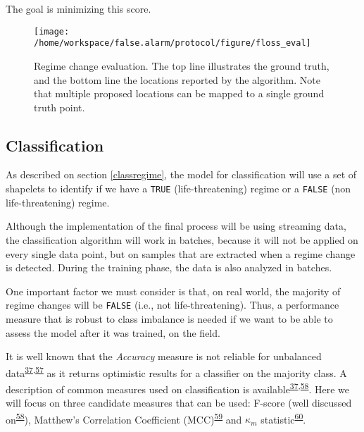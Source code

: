 \documentclass[12pt,twoside]{fmupthesis}
\begin{document}
The goal is minimizing this score.
\begin{figure}

{\centering \texttt{[image: /home/workspace/false.alarm/protocol/figure/floss\_eval]} 

}

\caption{Regime change evaluation. The top line illustrates the ground truth, and the bottom line the locations reported by the algorithm. Note that multiple proposed locations can be mapped to a single ground truth point.}\label{fig:flosseval}
\end{figure}
\hypertarget{classification}{%
\subsection{Classification}\label{classification}}

As described on section \ref{classregime}, the model for classification will use a set of shapelets
to identify if we have a \texttt{TRUE} (life-threatening) regime or a \texttt{FALSE} (non life-threatening) regime.

Although the implementation of the final process will be using streaming data, the classification
algorithm will work in batches, because it will not be applied on every single data point, but on
samples that are extracted when a regime change is detected. During the training phase, the data is
also analyzed in batches.

One important factor we must consider is that, on real world, the majority of regime changes will be
\texttt{FALSE} (i.e., not life-threatening). Thus, a performance measure that is robust to class imbalance
is needed if we want to be able to assess the model after it was trained, on the field.

It is well known that the \emph{Accuracy} measure is not reliable for unbalanced data\textsuperscript{\protect\hyperlink{ref-Akosa2017}{37},\protect\hyperlink{ref-Bekkar2013}{57}} as it returns optimistic results for a classifier on the majority class. A
description of common measures used on classification is available\textsuperscript{\protect\hyperlink{ref-Akosa2017}{37},\protect\hyperlink{ref-Chicco2020}{58}}. Here
we will focus on three candidate measures that can be used: F-score (well discussed on\textsuperscript{\protect\hyperlink{ref-Chicco2020}{58}}), Matthew's Correlation Coefficient (MCC)\textsuperscript{\protect\hyperlink{ref-Matthews1975}{59}} and \(\kappa_m\) statistic\textsuperscript{\protect\hyperlink{ref-Bifet2015}{60}}.
\end{document}
